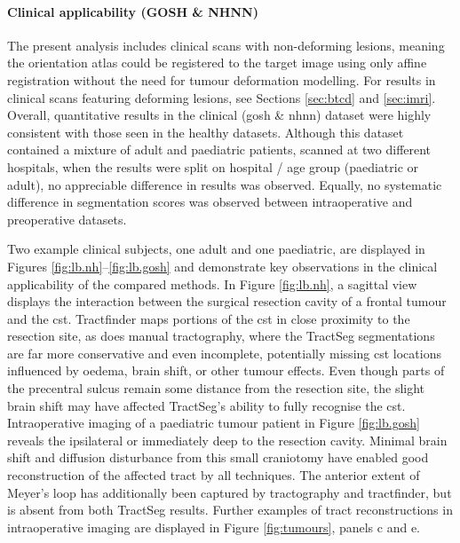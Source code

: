 \paragraph*{Clinical applicability (GOSH \& NHNN)}

The present analysis includes clinical scans with non-deforming lesions, meaning the orientation atlas could be registered to the target image using only affine registration without the need for tumour deformation modelling.
For results in clinical scans featuring deforming lesions, see Sections \ref{sec:btcd} and \ref{sec:imri}. %
Overall, quantitative results in the clinical (\gls{gosh} \& \gls{nhnn}) dataset were highly consistent with those seen in the healthy datasets.
Although this dataset contained a mixture of adult and paediatric patients, scanned at two different hospitals, when the results were split on hospital / age group (paediatric or adult), no appreciable difference in results was observed.
Equally, no systematic difference in segmentation scores was observed between intraoperative and preoperative datasets.

Two example clinical subjects, one adult and one paediatric, are displayed in Figures \ref{fig:lb.nh}--\ref{fig:lb.gosh} and demonstrate key observations in the clinical applicability of the compared methods.
In Figure \ref{fig:lb.nh}, a sagittal view displays the interaction between the surgical resection cavity of a frontal tumour and the \gls{cst}.
Tractfinder maps portions of the \gls{cst} in close proximity to the resection site, as does manual tractography, where the TractSeg segmentations are far more conservative and even incomplete, potentially missing \gls{cst} locations influenced by oedema, brain shift, or other tumour effects.
Even though parts of the precentral sulcus remain some distance from the resection site, the slight brain shift may have affected TractSeg's ability to fully recognise the \gls{cst}.
Intraoperative imaging of a paediatric tumour patient in Figure \ref{fig:lb.gosh} reveals the ipsilateral \gls{or} immediately deep to the resection cavity.
Minimal brain shift and diffusion disturbance from this small craniotomy have enabled good reconstruction of the affected tract by all techniques.
The anterior extent of Meyer's loop has additionally been captured by tractography and tractfinder, but is absent from both TractSeg results.
Further examples of tract reconstructions in intraoperative imaging are displayed in Figure \ref{fig:tumours}, panels c and e.

